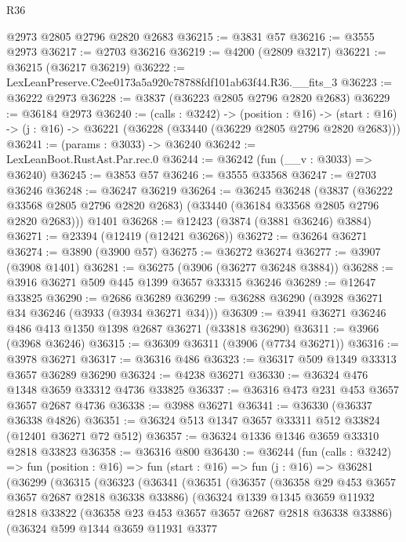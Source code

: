 \begin{lexlean}{R36}
\begin{coremodule}
    @2973
    @2805
    @2796
    @2820
    @2683
@36215 := @3831 @57
@36216 := @3555 @2973
@36217 := @2703 @36216
@36219 := @4200 (@2809 @3217)
@36221 := @36215 (@36217 @36219)
@36222 := LexLeanPreserve.C2ee0173a5a920c78788fdf101ab63f44.R36.__fits_3
@36223 := @36222 @2973
@36228 := @3837 (@36223 @2805 @2796 @2820 @2683)
@36229 := @36184 @2973
@36240 := (calls : @3242) ->
  (position : @16) ->
  (start : @16) -> (j : @16) -> @36221 (@36228 (@33440 (@36229 @2805 @2796 @2820 @2683)))
@36241 := (params : @3033) -> @36240
@36242 := LexLeanBoot.RustAst.Par.rec.{0}
@36244 := @36242 (fun (__v : @3033) => @36240)
@36245 := @3853 @57
@36246 := @3555 @33568
@36247 := @2703 @36246
@36248 := @36247 @36219
@36264 := @36245
    @36248
    (@3837 (@36222 @33568 @2805 @2796 @2820 @2683) (@33440 (@36184 @33568 @2805 @2796 @2820 @2683)))
    @1401
@36268 := @12423 (@3874 (@3881 @36246) @3884)
@36271 := @23394 (@12419 (@12421 @36268))
@36272 := @36264 @36271
@36274 := @3890 (@3900 @57)
@36275 := @36272 @36274
@36277 := @3907 (@3908 @1401)
@36281 := @36275 (@3906 (@36277 @36248 @3884))
@36288 := @3916 @36271 @509 @445 @1399 @3657 @33315 @36246
@36289 := @12647 @33825
@36290 := @2686 @36289
@36299 := @36288 @36290 (@3928 @36271 @34 @36246 (@3933 (@3934 @36271 @34)))
@36309 := @3941 @36271 @36246 @486 @413 @1350 @1398 @2687 @36271 (@33818 @36290)
@36311 := @3966 (@3968 @36246)
@36315 := @36309 @36311 (@3906 (@7734 @36271))
@36316 := @3978 @36271
@36317 := @36316 @486
@36323 := @36317 @509 @1349 @33313 @3657 @36289 @36290
@36324 := @4238 @36271
@36330 := @36324 @476 @1348 @3659 @33312 @4736 @33825
@36337 := @36316 @473 @231 @453 @3657 @3657 @2687 @4736
@36338 := @3988 @36271
@36341 := @36330 (@36337 @36338 @4826)
@36351 := @36324 @513 @1347 @3657 @33311 @512 @33824 (@12401 @36271 @72 @512)
@36357 := @36324 @1336 @1346 @3659 @33310 @2818 @33823
@36358 := @36316 @800
@36430 := @36244
    (fun (calls : @3242) =>
    fun (position : @16) =>
    fun (start : @16) =>
    fun (j : @16) =>
    @36281
      (@36299
        (@36315
          (@36323
            (@36341
              (@36351
                (@36357
                  (@36358 @29 @453 @3657 @3657 @2687 @2818 @36338 @33886)
                  (@36324
                    @1339
                    @1345
                    @3659
                    @11932
                    @2818
                    @33822
                    (@36358 @23 @453 @3657 @3657 @2687 @2818 @36338 @33886)
                    (@36324
                      @599
                      @1344
                      @3659
                      @11931
                      @3377

\end{coremodule}
\end{lexlean}
